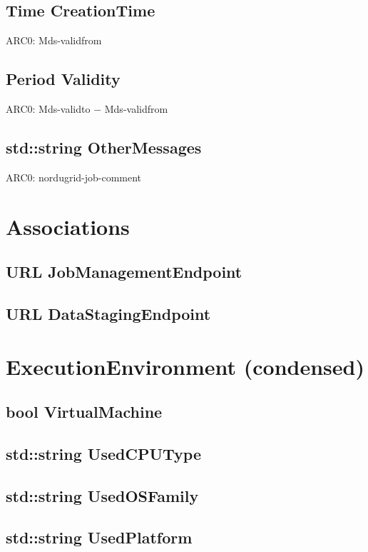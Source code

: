 \documentclass{book}
\begin{document}
\subsection*{Time CreationTime}

ARC0: Mds-validfrom

\subsection*{Period Validity}

ARC0: Mds-validto $-$ Mds-validfrom

\subsection*{std::string OtherMessages}

ARC0: nordugrid-job-comment

\section{Associations}

\subsection*{URL JobManagementEndpoint}

\subsection*{URL DataStagingEndpoint}

\section{ExecutionEnvironment (condensed)}

\subsection*{bool VirtualMachine}

\subsection*{std::string UsedCPUType}

\subsection*{std::string UsedOSFamily}

\subsection*{std::string UsedPlatform}


\end{document}
